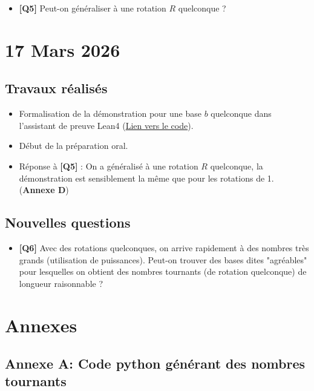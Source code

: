 \documentclass[a4paper,12pt]{article}
\begin{document}
\begin{itemize}[label=\textbullet]
    \item \textbf{[Q5]} Peut-on généraliser à une rotation $R$ quelconque ?
\end{itemize}

\clearpage

\section{17 Mars 2026}

\subsection*{Travaux réalisés}

\begin{itemize}[label=\textbullet]
    \item Formalisation de la démonstration pour une base $b$ quelconque dans l'assistant de preuve Lean4 (\href{https://github.com/Bfault/etude/blob/dev/cours/L2/questions_ouvertes/parasite/Parasite.lean}{Lien vers le code}).
    \item Début de la préparation oral.
    \item Réponse à \textbf{[Q5]} : On a généralisé à une rotation $R$ quelconque, la démonstration est sensiblement la même que pour les rotations de 1. (\textbf{Annexe D})
\end{itemize}

\subsection*{Nouvelles questions}

\begin{itemize}[label=\textbullet]
    \item \textbf{[Q6]} Avec des rotations quelconques, on arrive rapidement à des nombres très grands (utilisation de puissances). Peut-on trouver des bases dites "agréables" pour lesquelles on obtient des nombres tournants (de rotation quelconque) de longueur raisonnable ?
\end{itemize}

\clearpage

\section{Annexes}

\subsection*{Annexe A: Code python générant des nombres tournants}
\end{document}
